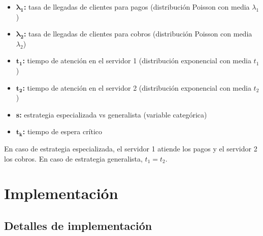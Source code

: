 \documentclass[letterpaper, 12pt]{report}
\begin{document}
\begin{itemize}
    \item \(\mathbf{\lambda_1}\)\textbf{:} tasa de llegadas de clientes para pagos (distribución Poisson con media $\lambda_1$)
    \item \(\mathbf{\lambda_2}\)\textbf{:} tasa de llegadas de clientes para cobros (distribución Poisson con media $\lambda_2$)    
    \item \(\mathbf{t_1}\)\textbf{:} tiempo de atención en el servidor 1 (distribución exponencial con media $t_1$)
    \item \(\mathbf{t_2}\)\textbf{:} tiempo de atención en el servidor 2 (distribución exponencial con media $t_2$)
    \item \textbf{s:} estrategia especializada vs generalista (variable categórica)
    \item \(\mathbf{t_k}\)\textbf{:} tiempo de espera crítico 
\end{itemize}

En caso de estrategia especializada, el servidor 1 atiende los pagos y el servidor 2 los cobros. En caso de estrategia generalista, $t_1 = t_2$.



\chapter{Implementación}

\section{Detalles de implementación}
\end{document}

